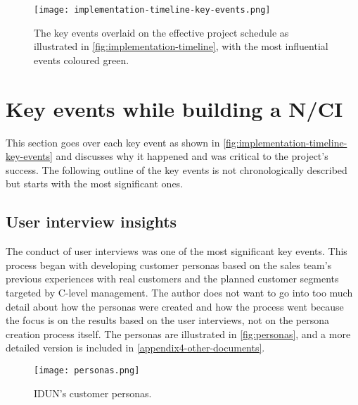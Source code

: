 \begin{figure}[!ht]
  \centering
  \texttt{[image: implementation-timeline-key-events.png]}
  \caption{The key events overlaid on the effective project schedule as illustrated in \autoref{fig:implementation-timeline}, with the most influential events coloured green.}
  \label{fig:implementation-timeline-key-events}
\end{figure}


\section{Key events while building a N/CI}
\label{chapter4-key-events}

This section goes over each key event as shown in \autoref{fig:implementation-timeline-key-events} and discusses why it happened and was critical to the project's success. The following outline of the key events is not chronologically described but starts with the most significant ones.

\subsection{User interview insights}
\label{chapter4-user-interview-insights}

The conduct of user interviews was one of the most significant key events. This process began with developing customer personas based on the sales team's previous experiences with real customers and the planned customer segments targeted by C-level management. The author does not want to go into too much detail about how the personas were created and how the process went because the focus is on the results based on the user interviews, not on the persona creation process itself. The personas are illustrated in \autoref{fig:personas}, and a more detailed version is included in \autoref{appendix4-other-documents}.

\begin{figure}[!ht]
  \centering
  \texttt{[image: personas.png]}
  \caption{IDUN's customer personas.}
  \label{fig:personas}
\end{figure}

